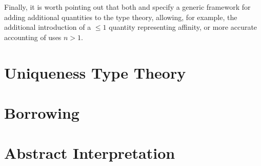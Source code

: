 Finally, it is worth pointing out that both \cite{lindley_i_2016} and \cite{atkey_syntax_2018} specify a generic framework for adding additional quantities to the type theory, allowing, for example, the additional introduction of a $\leq1$ quantity representing affinity, or more accurate accounting of uses $n > 1$.

\section{Uniqueness Type Theory}\label{sec:uniqueness}

\section{Borrowing}\label{sec:borrowingbackground}

\section{Abstract Interpretation}